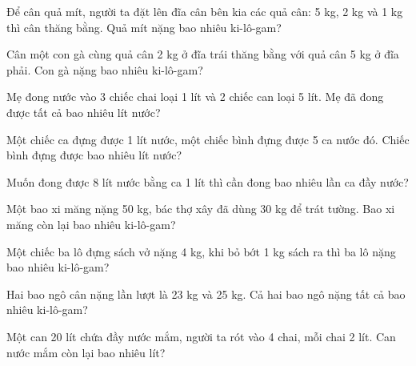\begin{ex}
Để cân quả mít, người ta đặt lên đĩa cân bên kia các quả cân: 5 kg, 2 kg và 1 kg thì cân thăng bằng. Quả mít nặng bao nhiêu ki-lô-gam?
\end{ex}

\begin{ex}
Cân một con gà cùng quả cân 2 kg ở đĩa trái thăng bằng với quả cân 5 kg ở đĩa phải. Con gà nặng bao nhiêu ki-lô-gam?
\end{ex}

\begin{ex}
Mẹ đong nước vào 3 chiếc chai loại 1 lít và 2 chiếc can loại 5 lít. Mẹ đã đong được tất cả bao nhiêu lít nước?
\end{ex}

\begin{ex}
Một chiếc ca đựng được 1 lít nước, một chiếc bình đựng được 5 ca nước đó. Chiếc bình đựng được bao nhiêu lít nước?
\end{ex}

\begin{ex}
Muốn đong được 8 lít nước bằng ca 1 lít thì cần đong bao nhiêu lần ca đầy nước?
\end{ex}

\begin{ex}
Một bao xi măng nặng 50 kg, bác thợ xây đã dùng 30 kg để trát tường. Bao xi măng còn lại bao nhiêu ki-lô-gam?
\end{ex}

\begin{ex}
Một chiếc ba lô đựng sách vở nặng 4 kg, khi bỏ bớt 1 kg sách ra thì ba lô nặng bao nhiêu ki-lô-gam?
\end{ex}

\begin{ex}
Hai bao ngô cân nặng lần lượt là 23 kg và 25 kg. Cả hai bao ngô nặng tất cả bao nhiêu ki-lô-gam?
\end{ex}

\begin{ex}
Một can 20 lít chứa đầy nước mắm, người ta rót vào 4 chai, mỗi chai 2 lít. Can nước mắm còn lại bao nhiêu lít?
\end{ex}

